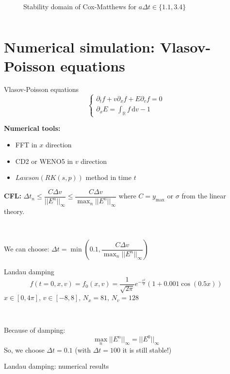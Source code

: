 \documentclass{beamer}
\newcommand{\mbold}[1]{{\textbf{\color{PLB}#1}}}
\begin{document}
\begin{frame}{}
\begin{columns}
\begin{column}{0.5\textwidth}
\begin{figure}
        \caption{Stability domain of Cox-Matthews for $a\Delta t\in\{1.1, 3.4\}$}
      \end{figure}
    \end{column}
  \end{columns}
\end{frame}

\section{Numerical simulation: Vlasov-Poisson equations}

\begin{frame}{Vlasov-Poisson equations}
  $$
    \begin{cases}
      \partial_tf + v\partial_xf + E\partial_vf = 0 \\
      \partial_xE = \int_{\mathbb{R}} f\,\mathrm{d}v - 1
    \end{cases}
  $$

  \mbold{Numerical tools:}
  \begin{itemize}
    \item FFT in $x$ direction
    \item CD2 or WENO5 in $v$ direction
    \item $Lawson(RK(s,p))$ method in time $t$
  \end{itemize}

  \mbold{CFL:} $\Delta t_n \leq \dfrac{C\Delta v}{||E^n||_{\infty}} \leq \dfrac{C\Delta v}{\max_n||E^n||_{\infty}}$ where $C = y_\text{max}$ or $\sigma$ from the linear theory.

  \ 

  We can choose: $\Delta t = \min\left( 0.1 , \dfrac{C\Delta v}{\max_n||E^n||_{\infty}} \right)$
\end{frame}
\begin{frame}{Landau damping}
  $$
    f(t=0,x,v) = f_0(x,v) = \frac{1}{\sqrt{2\pi}}e^{-\frac{v^2}{2}}(1+0.001\cos(0.5x))
  $$
  $x\in[0,4\pi]$, $v\in[-8,8]$, $N_x = 81$, $N_v=128$

  \ 

  Because of damping:
  $$
    \max_n||E^n||_{\infty} = ||E^0||_\infty
  $$
  So, we choose $\Delta t = 0.1$ (with $\Delta t = 100$ it is still stable!)
\end{frame}
\begin{frame}{Landau damping: numerical results}
\end{frame}
\end{document}
